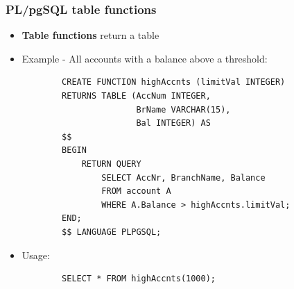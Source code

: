 \subsubsection{PL/pgSQL table functions}
\begin{itemize}
    \item \textbf{Table functions} return a table
    \item Example - All accounts with a balance above a threshold:
    \begin{lstlisting}
        CREATE FUNCTION highAccnts (limitVal INTEGER)
        RETURNS TABLE (AccNum INTEGER,
                       BrName VARCHAR(15),
                       Bal INTEGER) AS
        $$
        BEGIN
            RETURN QUERY
                SELECT AccNr, BranchName, Balance
                FROM account A
                WHERE A.Balance > highAccnts.limitVal;
        END;
        $$ LANGUAGE PLPGSQL;
    \end{lstlisting}
    \item Usage:
    \begin{lstlisting}
        SELECT * FROM highAccnts(1000);
    \end{lstlisting}
\end{itemize}


